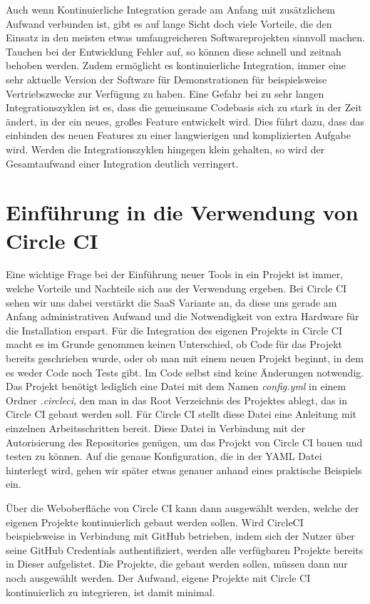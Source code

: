 \documentclass[11pt]{article}
\begin{document}
Auch wenn Kontinuierliche Integration gerade am Anfang mit zusätzlichem Aufwand verbunden ist, gibt es
auf lange Sicht doch viele Vorteile, die den Einsatz in den meisten etwas umfangreicheren
Softwareprojekten sinnvoll machen.
Tauchen bei der Entwicklung Fehler auf, so können diese schnell und zeitnah behoben werden.
Zudem ermöglicht es kontinuierliche Integration, immer eine sehr aktuelle Version der Software für
Demonstrationen für beispielsweise Vertriebszwecke zur Verfügung zu haben.
Eine Gefahr bei zu sehr langen Integrationszyklen ist es, dass die gemeinsame Codebasis sich zu
stark in der Zeit ändert, in der ein neues, großes Feature entwickelt wird. Dies führt dazu, dass
das einbinden des neuen Features zu einer langwierigen und komplizierten Aufgabe wird. Werden die
Integrationszyklen hingegen klein gehalten, so wird der Gesamtaufwand einer Integration deutlich
verringert.

\section{Einführung in die Verwendung von Circle CI}
Eine wichtige Frage bei der Einführung neuer Tools in ein Projekt ist immer, welche Vorteile und
Nachteile sich aus der Verwendung ergeben. Bei Circle CI sehen wir uns dabei verstärkt die SaaS
Variante an, da diese uns gerade am Anfang administrativen Aufwand und die Notwendigkeit von
extra Hardware für die Installation erspart. Für die Integration des eigenen Projekts in Circle CI
macht es im Grunde genommen keinen Unterschied, ob Code für das Projekt bereits geschrieben wurde,
oder ob man mit einem neuen Projekt beginnt, in dem es weder Code noch Tests gibt. Im Code selbst
sind keine Änderungen notwendig. Das Projekt benötigt lediglich eine Datei mit dem Namen
\textit{config.yml} in einem Ordner \textit{.circleci}, den man in das Root Verzeichnis des Projektes
ablegt, das in Circle CI gebaut werden soll. Für Circle CI stellt diese Datei eine Anleitung mit
einzelnen Arbeitsschritten bereit. Diese Datei in Verbindung mit der Autorisierung des Repositories
genügen, um das Projekt von Circle CI bauen und testen zu können. Auf die genaue Konfiguration, die
in der YAML Datei hinterlegt wird, gehen wir später etwas genauer anhand eines praktische Beispiels
ein.

Über die Weboberfläche von Circle CI kann dann ausgewählt werden, welche der eigenen Projekte
kontinuierlich gebaut werden sollen. Wird CircleCI beispielsweise in Verbindung mit GitHub betrieben,
indem sich der Nutzer über seine GitHub Credentials authentifiziert, werden alle verfügbaren Projekte
bereits in Dieser aufgelistet. Die Projekte, die gebaut werden sollen, müssen dann nur noch ausgewählt
werden. Der Aufwand, eigene Projekte mit Circle CI kontinuierlich zu integrieren, ist damit minimal. 
\end{document}
